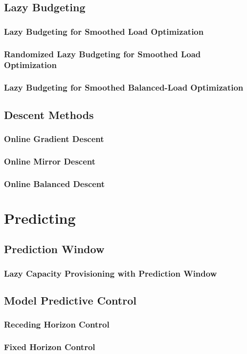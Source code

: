 \subsection{Lazy Budgeting}

\subsubsection{Lazy Budgeting for Smoothed Load Optimization}

\subsubsection{Randomized Lazy Budgeting for Smoothed Load Optimization}

\subsubsection{Lazy Budgeting for Smoothed Balanced-Load Optimization}

\subsection{Descent Methods}\label{section:online_algorithms:md:descent_methods}

\subsubsection{Online Gradient Descent}

\subsubsection{Online Mirror Descent}

\subsubsection{Online Balanced Descent}

\section{Predicting}

\subsection{Prediction Window}

\subsubsection{Lazy Capacity Provisioning with Prediction Window}

\subsection{Model Predictive Control}

\subsubsection{Receding Horizon Control}

\subsubsection{Fixed Horizon Control}
